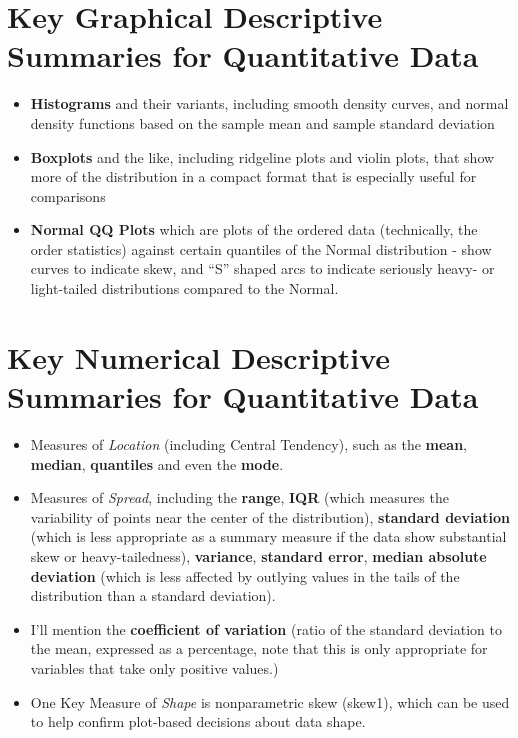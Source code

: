 \documentclass[
]{book}
\providecommand{\tightlist}{%
  \setlength{\itemsep}{0pt}\setlength{\parskip}{0pt}}
\begin{document}
\hypertarget{key-graphical-descriptive-summaries-for-quantitative-data}{%
\section{Key Graphical Descriptive Summaries for Quantitative Data}\label{key-graphical-descriptive-summaries-for-quantitative-data}}

\begin{itemize}
\tightlist
\item
  \textbf{Histograms} and their variants, including smooth density curves, and normal density functions based on the sample mean and sample standard deviation
\item
  \textbf{Boxplots} and the like, including ridgeline plots and violin plots, that show more of the distribution in a compact format that is especially useful for comparisons
\item
  \textbf{Normal QQ Plots} which are plots of the ordered data (technically, the order statistics) against certain quantiles of the Normal distribution - show curves to indicate skew, and ``S'' shaped arcs to indicate seriously heavy- or light-tailed distributions compared to the Normal.
\end{itemize}

\hypertarget{key-numerical-descriptive-summaries-for-quantitative-data}{%
\section{Key Numerical Descriptive Summaries for Quantitative Data}\label{key-numerical-descriptive-summaries-for-quantitative-data}}

\begin{itemize}
\tightlist
\item
  Measures of \emph{Location} (including Central Tendency), such as the \textbf{mean}, \textbf{median}, \textbf{quantiles} and even the \textbf{mode}.
\item
  Measures of \emph{Spread}, including the \textbf{range}, \textbf{IQR} (which measures the variability of points near the center of the distribution), \textbf{standard deviation} (which is less appropriate as a summary measure if the data show substantial skew or heavy-tailedness), \textbf{variance}, \textbf{standard error}, \textbf{median absolute deviation} (which is less affected by outlying values in the tails of the distribution than a standard deviation).
\item
  I'll mention the \textbf{coefficient of variation} (ratio of the standard deviation to the mean, expressed as a percentage, note that this is only appropriate for variables that take only positive values.)
\item
  One Key Measure of \emph{Shape} is nonparametric skew (skew1), which can be used to help confirm plot-based decisions about data shape.
\end{itemize}
\end{document}

